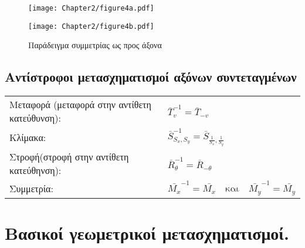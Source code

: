 \begin{figure}[h!]
\begin{center}
\begin{minipage}[b]{0.48\textwidth} %
    \texttt{[image: Chapter2/figure4a.pdf]}
\end{minipage}%
\hfill
\begin{minipage}[b]{0.48\textwidth} %
    \texttt{[image: Chapter2/figure4b.pdf]}
\end{minipage}

%
\end{center}
  \caption{Παράδειγμα συμμετρίας ως προς άξονα}
\end{figure}

\subsection{ Αντίστροφοι μετασχηματισμοί αξόνων συντεταγμένων}


\begin{tabular}{m{}m{}}
	Μεταφορά (μεταφορά στην αντίθετη κατεύθυνση): & $ \bar{T}_v^{-1} = \bar{T}_{-v} $\\
	Κλίμακα: & $\bar{S}_{S_x, S_y}^{-1} = \bar{S}_{\frac{1}{S_x}, \frac{1}{S_y}}$\\
	Στροφή(στροφή στην αντίθετη κατεύθηνση):& $ \bar{R}_\theta^{-1} = \bar{R}_{-\theta} $\\
	Συμμετρία: & $\bar{M_x}^{-1} = \bar{M_x} \quad \text{και} \quad \bar{M_y}^{-1} = \bar{M_y}$
\end{tabular}




\section{Βασικοί γεωμετρικοί μετασχηματισμοί.}

